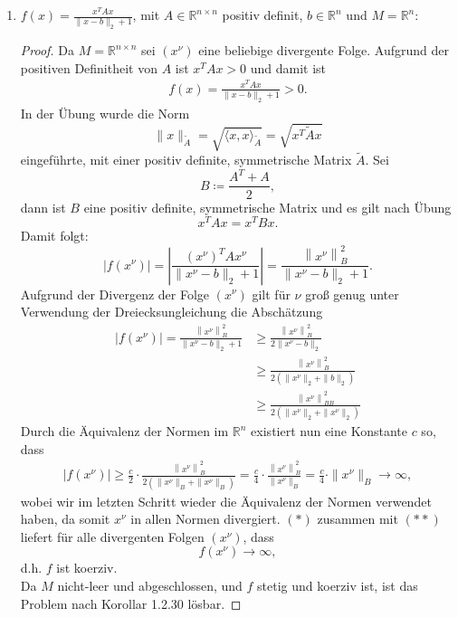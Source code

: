 \documentclass[12pt]{extreport} %
\newcommand{\R}{\mathbb{R}}
\theoremstyle{named}
\theoremstyle{nnamed}
\theoremstyle{itshape}
\theoremstyle{normal}
\begin{document}
\begin{enumerate}
\begin{proof}
			Es gilt $f(x) = (3 x_1 - x_2^2)^2 \geq 0 = \inf_{x \in M} f(x)$, wobei 
			$$ f(x) = 0 \iff (3 x_1 - x_2^2)^2 = 0 \iff x_1 = \frac{x_2^2}{3} $$
			Da es $(x_1, x_2) \in M$ gibt, die die obige Bedingung erfüllen, z.B. $x = (1/3, 1)$, nimmt $f$ auf $M$ sein Infimum an, und das Problem ist nach Definition 1.2.3. lösbar.
			\end{proof}
		\item $f(x) = \frac{x^T A x}{\| x - b\|_2 + 1}$, mit $A \in \R^{n \times n}$ positiv definit, $b \in \R^n$ und $M = \R^n$:
					\begin{proof}
			Da $M = \R^{n \times n}$ sei $(x^\nu)$ eine beliebige divergente Folge. Aufgrund der positiven Definitheit von $A$ ist $ x^T A x > 0$ und damit ist
			\begin{align}
				f(x) = \frac{x^T A x}{\| x - b\|_2 + 1} > 0. \tag*{$(*)$}
			\end{align}
			In der Übung wurde die Norm
			$$ \| x \|_{\tilde{A}} = \sqrt{\langle x, x \rangle_{\tilde{A}}} = \sqrt{x^T \tilde{A} x} $$
			eingeführte, mit einer positiv definite, symmetrische Matrix $\tilde{A}$. Sei
			$$B \coloneqq \frac{A^T + A}{2},$$
			dann ist $B$ eine positiv definite, symmetrische Matrix und es gilt nach Übung
			$$ x^T A x = x^T B x. $$
			Damit folgt:
			$$ \left| f(x^\nu) \right| =  \left| \frac{\left(x^\nu \right)^T A x^\nu }{\| x^\nu - b\|_2 + 1} \right| = \frac{\left\| x^\nu \right\|_{B}^2}{\| x^\nu - b\|_2 + 1}. $$
			Aufgrund der Divergenz der Folge $(x^\nu)$ gilt für $\nu$ groß genug unter Verwendung der Dreiecksungleichung die Abschätzung
			\begin{align*}
				 \left| f(x^\nu) \right| =  \frac{\left\| x^\nu \right\|_{B}^2}{\| x^\nu - b\|_2 + 1} & \geq \frac{\left\| x^\nu \right\|_{B}^2}{2 \| x^\nu - b\|_2 } \\
				 	& \geq \frac{\left\| x^\nu \right\|_{B}^2}{2 \left( \| x^\nu \|_2 + \| b\|_2 \right)}   \\
				 	& \geq \frac{\left\| x^\nu \right\|_{BB}^2}{2 \left( \| x^\nu \|_2 + \| x^\nu \|_2 \right)}  
			\end{align*}
			Durch die Äquivalenz der Normen im $\R^n$ existiert nun eine Konstante $c$ so, dass
			\begin{align}
				\left| f(x^\nu) \right|  \geq \frac{c}{2} \cdot \frac{\left\| x^\nu \right\|_{B}^2}{2 \left( \| x^\nu \|_B + \| x^\nu \|_B \right)} = \frac{c}{4} \cdot \frac{\left\| x^\nu \right\|_{B}^2}{ \| x^\nu \|_B} = \frac{c}{4} \cdot \| x^\nu \|_B \longrightarrow \infty, \tag*{$(**)$}
			\end{align}		
			wobei wir im letzten Schritt wieder die Äquivalenz der Normen verwendet haben, da somit $x^\nu$ in allen Normen divergiert. $(*)$ zusammen mit $(**)$ liefert für alle divergenten Folgen $(x^\nu)$, dass 
			$$  f(x^\nu) \longrightarrow \infty, $$
			d.h. $f$ ist koerziv. ~\\
			
			Da $M$ nicht-leer und abgeschlossen, und $f$ stetig und koerziv ist, ist das Problem nach Korollar 1.2.30 lösbar.
		\end{proof}
	\end{enumerate}
\end{document}
